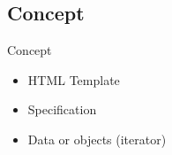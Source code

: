 \subsection{Concept}
\begin{frame}{Concept}
 \begin{itemize}
  \item HTML Template
  \item Specification
  \item Data or objects (iterator)
 \end{itemize}
\end{frame}
% 
% 








